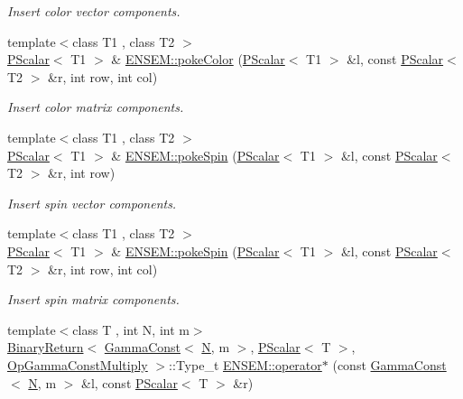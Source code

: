\begin{DoxyCompactItemize}
\begin{DoxyCompactList}\small\item\em Insert color vector components. \end{DoxyCompactList}\item 
{\footnotesize template$<$class T1 , class T2 $>$ }\\\mbox{\hyperlink{classENSEM_1_1PScalar}{P\+Scalar}}$<$ T1 $>$ \& \mbox{\hyperlink{group__primscalar_ga540606e7a9a4e2fbb97da4a95bc1c21f}{E\+N\+S\+E\+M\+::poke\+Color}} (\mbox{\hyperlink{classENSEM_1_1PScalar}{P\+Scalar}}$<$ T1 $>$ \&l, const \mbox{\hyperlink{classENSEM_1_1PScalar}{P\+Scalar}}$<$ T2 $>$ \&r, int row, int col)
\begin{DoxyCompactList}\small\item\em Insert color matrix components. \end{DoxyCompactList}\item 
{\footnotesize template$<$class T1 , class T2 $>$ }\\\mbox{\hyperlink{classENSEM_1_1PScalar}{P\+Scalar}}$<$ T1 $>$ \& \mbox{\hyperlink{group__primscalar_gaef0821cb16093e96134a98e5a765c45a}{E\+N\+S\+E\+M\+::poke\+Spin}} (\mbox{\hyperlink{classENSEM_1_1PScalar}{P\+Scalar}}$<$ T1 $>$ \&l, const \mbox{\hyperlink{classENSEM_1_1PScalar}{P\+Scalar}}$<$ T2 $>$ \&r, int row)
\begin{DoxyCompactList}\small\item\em Insert spin vector components. \end{DoxyCompactList}\item 
{\footnotesize template$<$class T1 , class T2 $>$ }\\\mbox{\hyperlink{classENSEM_1_1PScalar}{P\+Scalar}}$<$ T1 $>$ \& \mbox{\hyperlink{group__primscalar_gafc9650865b3cf15e32d79e07d1c01eff}{E\+N\+S\+E\+M\+::poke\+Spin}} (\mbox{\hyperlink{classENSEM_1_1PScalar}{P\+Scalar}}$<$ T1 $>$ \&l, const \mbox{\hyperlink{classENSEM_1_1PScalar}{P\+Scalar}}$<$ T2 $>$ \&r, int row, int col)
\begin{DoxyCompactList}\small\item\em Insert spin matrix components. \end{DoxyCompactList}\item 
{\footnotesize template$<$class T , int N, int m$>$ }\\\mbox{\hyperlink{structENSEM_1_1BinaryReturn}{Binary\+Return}}$<$ \mbox{\hyperlink{classENSEM_1_1GammaConst}{Gamma\+Const}}$<$ \mbox{\hyperlink{adat__devel_2lib_2hadron_2operator__name__util_8cc_a7722c8ecbb62d99aee7ce68b1752f337}{N}}, m $>$, \mbox{\hyperlink{classENSEM_1_1PScalar}{P\+Scalar}}$<$ T $>$, \mbox{\hyperlink{structENSEM_1_1OpGammaConstMultiply}{Op\+Gamma\+Const\+Multiply}} $>$\+::Type\+\_\+t \mbox{\hyperlink{group__primscalar_gaa4466bc56a8afcb00e7d7e37cc22d441}{E\+N\+S\+E\+M\+::operator$\ast$}} (const \mbox{\hyperlink{classENSEM_1_1GammaConst}{Gamma\+Const}}$<$ \mbox{\hyperlink{adat__devel_2lib_2hadron_2operator__name__util_8cc_a7722c8ecbb62d99aee7ce68b1752f337}{N}}, m $>$ \&l, const \mbox{\hyperlink{classENSEM_1_1PScalar}{P\+Scalar}}$<$ T $>$ \&r)

\end{DoxyCompactItemize}
